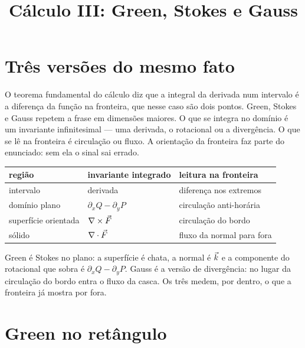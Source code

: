 \documentclass[11pt,a4paper]{article}
\title{Cálculo III: Green, Stokes e Gauss}
\author{}
\date{}
\begin{document}
\maketitle
\tableofcontents

\section{Três versões do mesmo fato}

O teorema fundamental do cálculo diz que a integral da derivada num intervalo é a diferença da função na fronteira, que nesse caso são dois pontos. Green, Stokes e Gauss repetem a frase em dimensões maiores. O que se integra no domínio é um invariante infinitesimal --- uma derivada, o rotacional ou a divergência. O que se lê na fronteira é circulação ou fluxo. A orientação da fronteira faz parte do enunciado: sem ela o sinal sai errado.

\begin{center}
\begin{tabular}{lll}
\toprule
região & invariante integrado & leitura na fronteira \\
\midrule
intervalo & derivada & diferença nos extremos \\
domínio plano & $\partial_x Q-\partial_y P$ & circulação anti-horária \\
superfície orientada & $\nabla\times\vec{F}$ & circulação do bordo \\
sólido & $\nabla\cdot\vec{F}$ & fluxo da normal para fora \\
\bottomrule
\end{tabular}
\end{center}

Green é Stokes no plano: a superfície é chata, a normal é $\vec{k}$ e a componente do rotacional que sobra é $\partial_x Q-\partial_y P$. Gauss é a versão de divergência: no lugar da circulação do bordo entra o fluxo da casca. Os três medem, por dentro, o que a fronteira já mostra por fora.


\section{Green no retângulo}
\end{document}
